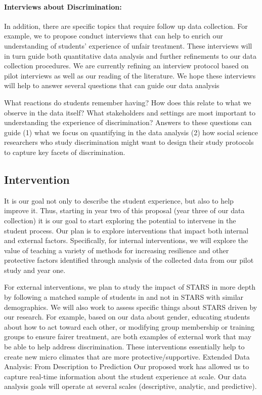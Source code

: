 \paragraph{Interviews about Discrimination:} In addition, there are specific topics that require follow up data collection. For example, we to propose conduct interviews that can help to enrich our understanding of students’ experience of unfair treatment. These interviews will in turn guide both quantitative data analysis and further refinements to our data collection procedures. We are currently refining an interview protocol based on pilot interviews as well as our reading of the literature. We hope these interviews will help to answer several questions that can guide our data analysis

What reactions do students remember having? How does this relate to what we observe in the data itself? 
What stakeholders and settings are most important to understanding the experience of discrimination? 
Answers to these questions can guide (1) what we focus on quantifying in the data analysis (2) how social science researchers who study discrimination might want to design their study protocols to capture key facets of discrimination.


\subsection{Intervention}
It is our goal not only to describe the student experience, but also to help improve it. Thus, starting in year two of this proposal (year three of our data collection) it is our goal to start exploring the potential to intervene in the student process. Our plan is to explore interventions that impact both internal and external factors. Specifically, for internal interventions, we will explore the value of teaching a variety of methods for increasing resilience and other protective factors identified through analysis of the collected data from our pilot study and year one.

For external interventions, we plan to study the impact of STARS in more depth by following a matched sample of students in and not in STARS with similar demographics. We will also work to assess specific things about STARS driven by our research. For example, based on our data about gender, educating students about how to act toward each other, or modifying group membership or training groups to ensure fairer treatment, are both examples of external work that may be able to help address discrimination. These interventions essentially help to create new micro climates that are more protective/supportive. 
Extended Data Analysis: From Description to Prediction
Our proposed work has allowed us to capture real-time information about the student experience at scale. Our data analysis goals will operate at several scales (descriptive, analytic, and predictive).

